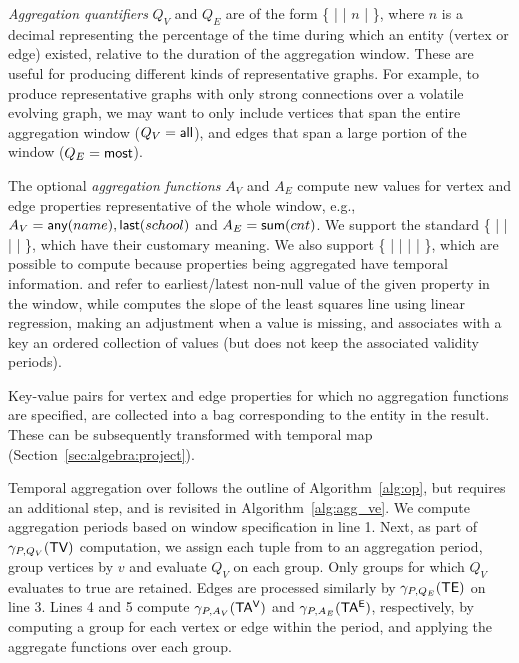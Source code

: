 
{\em Aggregation quantifiers} $Q_V$ and $Q_E$ are of the form \{
 |  |  $n$ |  \},
where $n$ is a decimal representing the percentage of the time during
which an entity (vertex or edge) existed, relative to the duration of
the aggregation window. These are useful for producing different kinds
of representative graphs.  For example, to produce representative
graphs with only strong connections over a volatile evolving graph, we
may want to only include vertices that span the entire aggregation
window ($Q_V=\textsf{all}$), and edges that span a large portion of the
window ($Q_E=\textsf{most}$).
 
The optional {\em aggregation functions} $A_V$ and $A_E$ compute new
values for vertex and edge properties representative of
the whole window, e.g., $A_V=\textsf{any}(name), \textsf{last}(school)$
and $A_E=\textsf{sum}(cnt)$.
%
We support the standard \{  |  |  |
 |  \}, which have their customary meaning.
We also support \{  |  |  |
 |  \}, which are possible to compute because
properties being aggregated have temporal information.  
and  refer to earliest/latest non-null value of the given
property in the window, while  computes the slope of the
least squares line using linear regression, making an adjustment when
a value is missing, and  associates with a key an ordered
collection of values (but does not keep the associated validity
periods).
 
Key-value pairs for vertex and edge properties for which no aggregation
functions are specified, are collected into a bag corresponding to the
entity in the result.  These can be subsequently transformed with
temporal map (Section~\ref{sec:algebra:project}).
 
Temporal aggregation over \tve follows the outline of
Algorithm~\ref{alg:op}, but requires an additional step, and is
revisited in Algorithm~\ref{alg:agg_ve}.
%
We compute aggregation periods based on window specification in line
1.  Next, as part of $\gamma_{P,Q_V}(\textsf{TV})$ computation, we assign each
tuple from \tv to an aggregation period, group vertices by $v$ and
evaluate $Q_V$ on each group.  Only groups for which $Q_V$ evaluates
to true are retained.  Edges are processed similarly by
$\gamma_{P,Q_E}(\textsf{TE})$ on line 3.  Lines 4 and 5 compute
$\gamma_{P,A_V}(\mathsf{TA^{V}})$ and $\gamma_{P,A_E}(\mathsf{TA^{E}})$, respectively, by
computing a group for each vertex or edge within the period, and
applying the aggregate functions over each group. 

